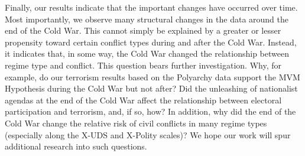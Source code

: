 \documentclass[titlepage, onecolumn,12pt]{article}
\begin{document}
Finally, our results indicate that the important changes have occurred over time.  Most importantly, we observe many structural changes in the data around the end of the Cold War.  This cannot simply be explained by a greater or lesser propensity toward certain conflict types during and after the Cold War.  Instead, it indicates that, in some way, the Cold War changed the relationship between regime type and conflict.  This question bears further investigation.  Why, for example, do our terrorism results based on the Polyarchy data support the MVM Hypothesis during the Cold War but not after?  Did the unleashing of nationalist agendas at the end of the Cold War affect the relationship between electoral participation and terrorism, and, if so, how?  In addition, why did the end of the Cold War change the relative risk of civil conflicts in many regime types (especially along the X-UDS and X-Polity scales)?  We hope our work will spur additional research into such questions.

\clearpage



\end{document}
